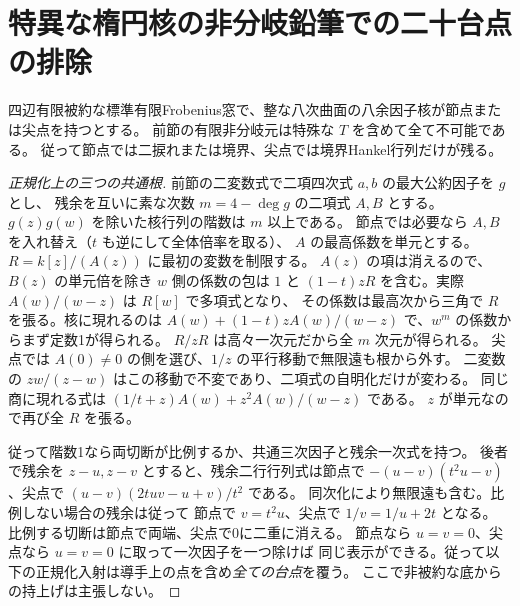 \section{特異な楕円核の非分岐鉛筆での二十台点の排除}
\label{sec:singular-residual-pencils}
\begin{theorem}\label{thm:singular-residual-pencils}
四辺有限被約な標準有限Frobenius窓で、整な八次曲面の八余因子核が節点または尖点を持つとする。
前節の有限非分岐元は特殊な $T$ を含めて全て不可能である。
従って節点では二捩れまたは境界、尖点では境界Hankel行列だけが残る。
\end{theorem}
\begin{proof}[正規化上の三つの共通根]
前節の二変数式で二項四次式 $a,b$ の最大公約因子を $g$ とし、
残余を互いに素な次数 $m=4-\deg g$ の二項式 $A,B$ とする。
$g(z)g(w)$ を除いた核行列の階数は $m$ 以上である。
節点では必要なら $A,B$ を入れ替え（$t$ も逆にして全体倍率を取る）、
$A$ の最高係数を単元とする。$R=k[z]/(A(z))$ に最初の変数を制限する。
$A(z)$ の項は消えるので、$B(z)$ の単元倍を除き $w$ 側の係数の包は
$1$ と $(1-t)zR$ を含む。実際 $A(w)/(w-z)$ は $R[w]$ で多項式となり、
その係数は最高次から三角で $R$ を張る。核に現れるのは
$A(w)+(1-t)z A(w)/(w-z)$ で、$w^m$ の係数からまず定数1が得られる。
$R/zR$ は高々一次元だから全 $m$ 次元が得られる。
尖点では $A(0)\ne0$ の側を選び、$1/z$ の平行移動で無限遠も根から外す。
二変数の $zw/(z-w)$ はこの移動で不変であり、二項式の自明化だけが変わる。
同じ商に現れる式は
$(1/t+z)A(w)+z^2 A(w)/(w-z)$ である。
$z$ が単元なので再び全 $R$ を張る。

従って階数1なら両切断が比例するか、共通三次因子と残余一次式を持つ。
後者で残余を $z-u,z-v$ とすると、残余二行行列式は節点で
$-(u-v)(t^2u-v)$、尖点で $(u-v)(2tuv-u+v)/t^2$ である。
同次化により無限遠も含む。比例しない場合の残余は従って
節点で $v=t^2u$、尖点で $1/v=1/u+2t$ となる。
比例する切断は節点で両端、尖点で0に二重に消える。
節点なら $u=v=0$、尖点なら $u=v=0$ に取って一次因子を一つ除けば
同じ表示ができる。従って以下の正規化入射は導手上の点を含め\emph{全ての台点}を覆う。
ここで非被約な底からの持上げは主張しない。
\end{proof}


